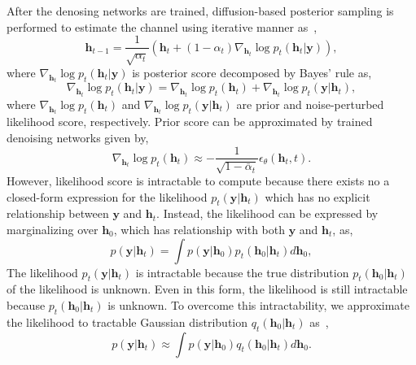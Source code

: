 \documentclass[lettersize,journal]{IEEEtran}
\begin{document}
After the denosing networks are trained, diffusion-based posterior sampling is performed to estimate the channel using iterative manner as~\cite{zhouGenerativeDiffusionModels2025},
\begin{equation}
\mathbf{h}_{t-1} = \frac{1}{\sqrt{ \alpha_{t} }}(\mathbf{h}_{t}+(1-\alpha_{t})\nabla_{\mathbf{h}_{t}}\log p_{t}(\mathbf{h}_{t}|\mathbf{y})),
\end{equation}
where $\nabla_{\mathbf{h}_{t}}\log p_{t}(\mathbf{h}_{t}|\mathbf{y})$ is posterior score decomposed by Bayes' rule as,
\begin{equation}
\nabla_{\mathbf{h}_{t}}\log p_{t}(\mathbf{h}_{t}|\mathbf{y}) = \nabla_{\mathbf{h}_{t}}\log p_{t}(\mathbf{h}_{t})+\nabla_{\mathbf{h}_{t}}\log p_{t}(\mathbf{y}|\mathbf{h}_{t}),
\end{equation}
where $\nabla_{\mathbf{h}_{t}}\log p_{t}(\mathbf{h}_{t})$ and $\nabla_{\mathbf{h}_{t}}\log p_{t}(\mathbf{y}|\mathbf{h}_{t})$ are prior and noise-perturbed likelihood score, respectively.
Prior score can be approximated by trained denoising networks given by,
\begin{equation}
\nabla_{\mathbf{h}_{t}}\log p_{t}(\mathbf{h}_{t})\approx -\frac{1}{\sqrt{ 1-\bar{\alpha}_{t} }}\epsilon_{\theta}(\mathbf{h}_{t},t).
\end{equation}
However, likelihood score is intractable to compute because there exists no a closed-form expression for the likelihood $p_{t}(\mathbf{y}|\mathbf{h}_{t})$ which has no explicit relationship between $\mathbf{y}$ and $\mathbf{h}_{t}$. Instead, the likelihood can be expressed by marginalizing over $\mathbf{h}_{0}$, which has relationship with both $\mathbf{y}$ and $\mathbf{h}_{t}$, as,
\begin{equation}
p(\mathbf{y}|\mathbf{h}_{t}) = \int p(\mathbf{y}|\mathbf{h}_{0})p_{t}(\mathbf{h}_{0}|\mathbf{h}_{t})d\mathbf{h}_{0},
\end{equation}
The likelihood $p_{t}(\mathbf{y}|\mathbf{h}_{t})$ is intractable because the true distribution $p_{t}(\mathbf{h}_{0}|\mathbf{h}_{t})$ of the likelihood is unknown. Even in this form, the likelihood is still intractable because $p_{t}(\mathbf{h}_{0}|\mathbf{h}_{t})$ is unknown. To overcome this intractability, we approximate the likelihood to tractable Gaussian distribution $q_{t}(\mathbf{h}_{0}|\mathbf{h}_{t})$ as~\cite{arvinteMIMOChannelEstimation2023,zhouGenerativeDiffusionModels2025},
\begin{equation}
p(\mathbf{y}|\mathbf{h}_{t}) \approx \int p(\mathbf{y}|\mathbf{h}_{0})q_{t}(\mathbf{h}_{0}|\mathbf{h}_{t})d\mathbf{h}_{0}.
\end{equation}
\end{document}
